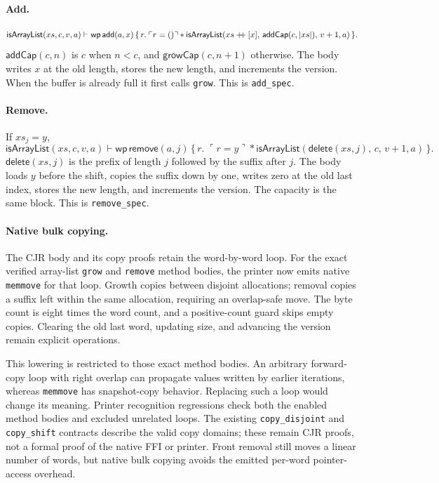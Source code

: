 \documentclass[11pt]{article}
\newcommand{\Unit}{\mathsf{()}}
\newcommand{\sep}{\mathbin{*}}
\newcommand{\Wpre}{\mathsf{wp}}
\newcommand{\pure}[1]{\ulcorner #1 \urcorner}
\begin{document}
\paragraph{Add.}
\[
\mathsf{isArrayList}(xs, c, v, a)
\vdash
\Wpre\,\mathsf{add}(a, x)
\,\{\,r.\; \pure{r = \Unit} \sep
  \mathsf{isArrayList}(xs \mathbin{+\mkern-6mu+} [x],\, \mathsf{addCap}(c, \lvert xs \rvert),\, v+1, a)\,\}.
\]
\(\mathsf{addCap}(c, n)\) is \(c\) when \(n < c\), and \(\mathsf{growCap}(c, n+1)\) otherwise.
The body writes \(x\) at the old length, stores the new length, and increments the version.
When the buffer is already full it first calls \texttt{grow}.
This is \texttt{add\_spec}.

\paragraph{Remove.}
If \(xs_j = y\),
\[
\mathsf{isArrayList}(xs, c, v, a)
\vdash
\Wpre\,\mathsf{remove}(a, j)
\,\{\,r.\; \pure{r = y} \sep
  \mathsf{isArrayList}(\mathsf{delete}(xs, j),\, c,\, v+1, a)\,\}.
\]
\(\mathsf{delete}(xs, j)\) is the prefix of length \(j\) followed by the suffix after \(j\).
The body loads \(y\) before the shift, copies the suffix down by one, writes zero at the old last index, stores the new length, and increments the version.
The capacity is the same block. This is \texttt{remove\_spec}.

\paragraph{Native bulk copying.} The CJR body and its copy proofs retain the
word-by-word loop. For the exact verified array-list \texttt{grow} and
\texttt{remove} method bodies, the printer now emits native \texttt{memmove}
for that loop. Growth copies between disjoint allocations; removal copies
a suffix left within the same allocation, requiring an overlap-safe move.
The byte count is eight times the word count, and a positive-count guard
skips empty copies. Clearing the old last word, updating size, and advancing
the version remain explicit operations.

This lowering is restricted to those exact method bodies. An arbitrary
forward-copy loop with right overlap can propagate values written by earlier
iterations, whereas \texttt{memmove} has snapshot-copy behavior. Replacing
such a loop would change its meaning. Printer recognition regressions check
both the enabled method bodies and excluded unrelated loops. The existing
\texttt{copy\_disjoint} and \texttt{copy\_shift} contracts describe the valid
copy domains; these remain CJR proofs, not a formal proof of the native FFI or
printer. Front removal still moves a linear number of words, but native bulk
copying avoids the emitted per-word pointer-access overhead.
\end{document}
